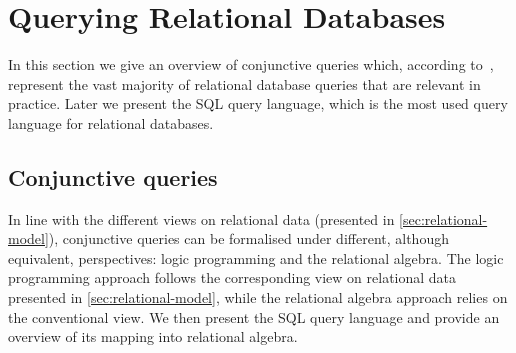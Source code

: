 
\section{Querying Relational Databases}
\label{sec:querying-rdb}

In this section we give an overview of conjunctive queries which, according to~\citet{AbiteboulHullVianu:1995aa},
represent the vast majority of relational database queries that are relevant in practice.  Later we present the \ac{SQL}
query language, which is the most used query language for relational databases.

\subsection{Conjunctive queries}
\label{sec:conjunctive-queries}
%
In line with the different views on relational data (presented in \cref{sec:relational-model}), conjunctive queries can
be formalised under different, although equivalent, perspectives: logic programming and the relational algebra.
%
The logic programming approach follows the corresponding view on relational data presented in
\cref{sec:relational-model}, while the relational algebra approach relies on the conventional view.
%
We then present the \acs{SQL} query language and provide an overview of its mapping into relational algebra.

